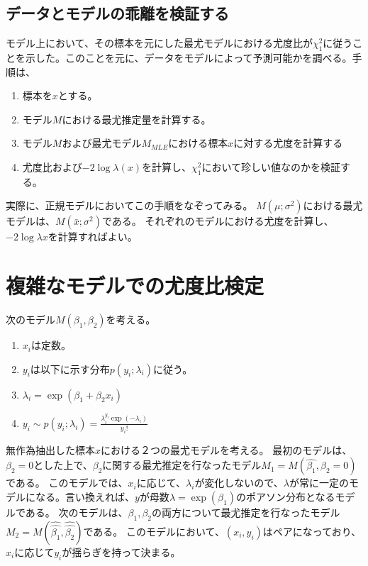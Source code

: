 \subsection{データとモデルの乖離を検証する}
モデル上において、その標本を元にした最尤モデルにおける尤度比が$\chi^2_1$に従うことを示した。このことを元に、データをモデルによって予測可能かを調べる。手順は、
\begin{enumerate}
    \item 標本を$x$とする。
    \item モデル$M$における最尤推定量を計算する。
    \item モデル$M$および最尤モデル$M_{MLE}$における標本$x$に対する尤度を計算する
    \item 尤度比および$-2\log\lambda(x)$を計算し、$\chi^2_1$において珍しい値なのかを検証する。
\end{enumerate}
実際に、正規モデルにおいてこの手順をなぞってみる。
$M(\mu;\sigma^2)$における最尤モデルは、$M(\bar{x};\sigma^2)$である。
それぞれのモデルにおける尤度を計算し、$-2\log\lambda{x}$を計算すればよい。

\section{複雑なモデルでの尤度比検定}
次のモデル$M(\beta_1,\beta_2)$を考える。
\begin{enumerate}
    \item $x_i$は定数。
    \item $y_i$は以下に示す分布$p(y_i;\lambda_i)$に従う。
    \item $\lambda_i = \exp(\beta_1+\beta_2 x_i)$
    \item $y_i \sim p(y_i;\lambda_i) = \frac{\lambda_i^{y_i}\exp(-\lambda_i)}{y_i!}$
\end{enumerate}
無作為抽出した標本$x$における２つの最尤モデルを考える。
最初のモデルは、$\beta_2=0$とした上で、$\beta_2$に関する最尤推定を行なったモデル$M_1=M(\hat{\beta_1},\beta_2=0)$である。
このモデルでは、$x_i$に応じて、$\lambda_i$が変化しないので、$\lambda$が常に一定のモデルになる。言い換えれば、$y$が母数$\lambda=\exp(\beta_1)$のポアソン分布となるモデルである。
次のモデルは、$\beta_1,\beta_2$の両方について最尤推定を行なったモデル$M_2=M(\hat{\hat{\beta_1}},\hat{\hat{\beta_2}})$である。
このモデルにおいて、$(x_i,y_i)$はペアになっており、$x_i$に応じて$y_i$が揺らぎを持って決まる。

